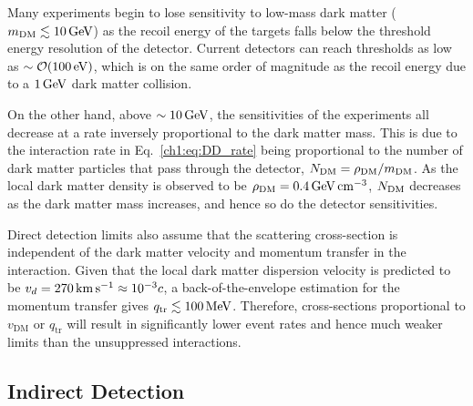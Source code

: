 Many experiments begin to lose sensitivity to low-mass dark matter ($m_\mathrm{DM}\lesssim 10{\rm \,GeV}$) as the recoil energy of the targets falls below the threshold energy resolution of the detector. Current detectors can reach thresholds as low as $\sim {\cal O} (100{\rm \,eV})$, which is on the same order of magnitude as the recoil energy due to a $1{\rm \,GeV}$ dark matter collision. 

On the other hand, above $\sim 10{\rm \,GeV}$, the sensitivities of the experiments all decrease at a rate inversely proportional to the dark matter mass.  This is due to the interaction rate in Eq.~\ref{ch1:eq:DD_rate} being proportional to the number of dark matter particles that pass through the detector, $N_\mathrm{DM} = \rho_\mathrm{DM}/m_\mathrm{DM}$. As the local dark matter density is observed to be $\rho_\mathrm{DM} = 0.4{\rm \,GeV} {\rm \,cm}^{-3}$, $N_\mathrm{DM}$ decreases as the dark matter mass increases, and hence so do the detector sensitivities. 

Direct detection limits also assume that the scattering cross-section is independent of the dark matter velocity and momentum transfer in the interaction. Given that the local dark matter dispersion velocity is predicted to be $v_d = 270{\rm \,km}{\rm \,s}^{-1} \approx 10^{-3}c$, a back-of-the-envelope estimation for the momentum transfer gives $q_\mathrm{tr}\lesssim 100 {\rm \,MeV}$. Therefore, cross-sections proportional to $v_\mathrm{DM}$ or $q_\mathrm{tr}$ will result in significantly lower event rates and hence much weaker limits than the unsuppressed interactions. 

\subsection{Indirect Detection}

